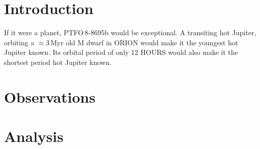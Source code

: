 \documentclass[12pt,twocolumn,tighten]{aastex62}
\begin{document}
\keywords{}


\section{Introduction}
If it were a planet, PTFO$\,$8-8695b would be exceptional.
A transiting hot Jupiter, orbiting a $\approx$3$\,$Myr old M dwarf
in ORION would make it the youngest hot Jupiter known.
Its orbital period of only 12 HOURS would also make it the shortest
period hot Jupiter known.


\section{Observations}
\label{sec:observations}


\section{Analysis}
\label{sec:analysis}
\end{document}
